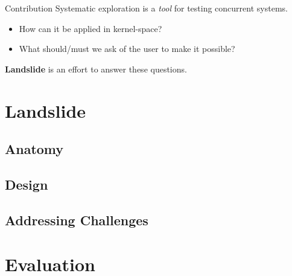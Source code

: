 \documentclass[xcolor=dvipsnames]{beamer}
\begin{document}
\begin{frame}{Contribution} %
	Systematic exploration is a {\em tool} for testing concurrent systems.
	\begin{itemize}
		\item How can it be applied in kernel-space?
		\item What should/must we ask of the user to make it possible?
	\end{itemize}
	\linegap

	{\bf Landslide} is an effort to answer these questions.
\end{frame}

\section{Landslide}


\subsection{Anatomy}

\subsection{Design}

\subsection{Addressing Challenges} %

\section{Evaluation}
\end{document}
